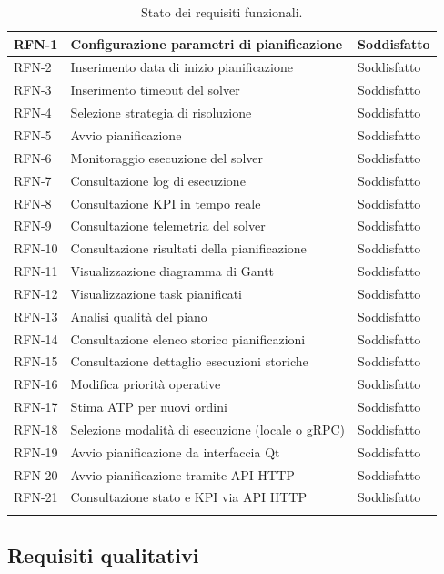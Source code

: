 \begin{center}
\begin{longtable}{|p{2.1cm}|p{7.5cm}|p{2.4cm}|}
RFN-1  & Configurazione parametri di pianificazione & Soddisfatto \\
\hline
RFN-2  & Inserimento data di inizio pianificazione & Soddisfatto \\
\hline
RFN-3  & Inserimento timeout del solver & Soddisfatto \\
\hline
RFN-4  & Selezione strategia di risoluzione & Soddisfatto \\
\hline
RFN-5  & Avvio pianificazione & Soddisfatto \\
\hline
RFN-6  & Monitoraggio esecuzione del solver & Soddisfatto \\
\hline
RFN-7  & Consultazione log di esecuzione & Soddisfatto \\
\hline
RFN-8  & Consultazione KPI in tempo reale & Soddisfatto \\
\hline
RFN-9  & Consultazione telemetria del solver & Soddisfatto \\
\hline
RFN-10 & Consultazione risultati della pianificazione & Soddisfatto \\
\hline
RFN-11 & Visualizzazione diagramma di Gantt & Soddisfatto \\
\hline
RFN-12 & Visualizzazione task pianificati & Soddisfatto \\
\hline
RFN-13 & Analisi qualità del piano & Soddisfatto \\
\hline
RFN-14 & Consultazione elenco storico pianificazioni & Soddisfatto \\
\hline
RFN-15 & Consultazione dettaglio esecuzioni storiche & Soddisfatto \\
\hline
RFN-16 & Modifica priorità operative & Soddisfatto \\
\hline
RFN-17 & Stima ATP per nuovi ordini & Soddisfatto \\
\hline
RFN-18 & Selezione modalità di esecuzione (locale o gRPC) & Soddisfatto \\
\hline
RFN-19 & Avvio pianificazione da interfaccia Qt & Soddisfatto \\
\hline
RFN-20 & Avvio pianificazione tramite API HTTP & Soddisfatto \\
\hline
RFN-21 & Consultazione stato e KPI via API HTTP & Soddisfatto \\
\hline

\caption{Stato dei requisiti funzionali.}
\label{tab:stato_requisiti_funzionali}
\end{longtable}
\end{center}

\subsection{Requisiti qualitativi}

